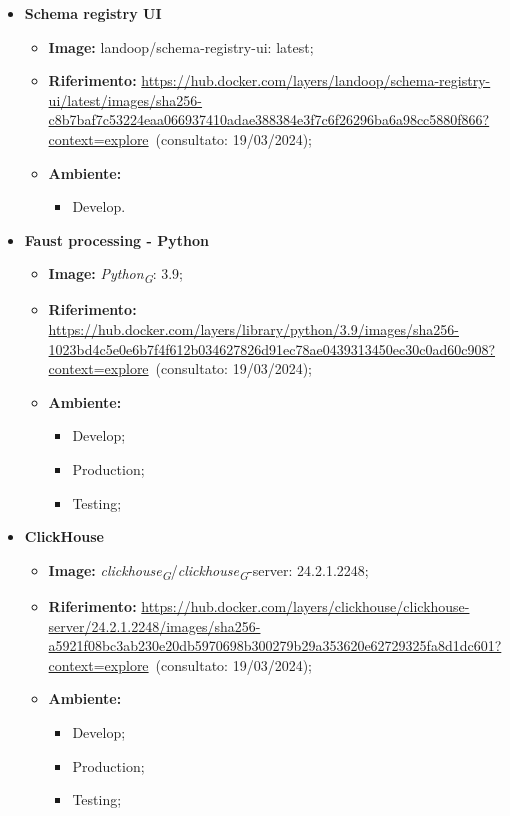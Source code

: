 \begin{itemize}
  \item \textbf{Schema registry UI} 
    \begin{itemize}
      \item \textbf{Image:} landoop/schema-registry-ui: latest;
      \item \textbf{Riferimento:} \url{https://hub.docker.com/layers/landoop/schema-registry-ui/latest/images/sha256-c8b7baf7c53224eaa066937410adae388384e3f7c6f26296ba6a98cc5880f866?context=explore}~(consultato: 19/03/2024);
      \item \textbf{Ambiente:}
        \begin{itemize}
          \item Develop.
        \end{itemize}
    \end{itemize}

  \item \textbf{Faust processing - Python} 
    \begin{itemize}
      \item \textbf{Image:} \textit{Python}\textsubscript{\textit{G}}: 3.9;
      \item \textbf{Riferimento:} \url{https://hub.docker.com/layers/library/python/3.9/images/sha256-1023bd4c5e0e6b7f4f612b034627826d91ec78ae0439313450ec30c0ad60c908?context=explore}~(consultato: 19/03/2024);
      \item \textbf{Ambiente:}
        \begin{itemize}
          \item Develop;
          \item Production;
          \item Testing;
        \end{itemize}
    \end{itemize}

  \item \textbf{ClickHouse} 
    \begin{itemize}
      \item \textbf{Image:} \textit{clickhouse}\textsubscript{\textit{G}}/\textit{clickhouse}\textsubscript{\textit{G}}-server: 24.2.1.2248;
      \item \textbf{Riferimento:} \url{https://hub.docker.com/layers/clickhouse/clickhouse-server/24.2.1.2248/images/sha256-a5921f08bc3ab230e20db5970698b300279b29a353620e62729325fa8d1dc601?context=explore}~(consultato: 19/03/2024);
      \item \textbf{Ambiente:}
        \begin{itemize}
          \item Develop;
          \item Production;
          \item Testing;
        \end{itemize}
    \end{itemize}


\end{itemize}
